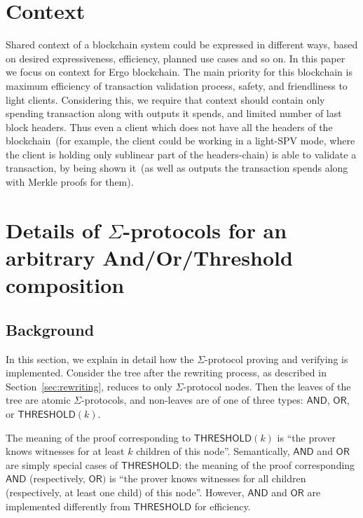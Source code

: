 \documentclass[11pt]{llncs}
\newcommand{\authnote}[2]{\marginpar{\parbox{\marginparwidth}{\tiny %
  \textsf{#1 {\textcolor{blue}{notes: #2}}}}}%
  \textcolor{blue}{\textbf{\dag}}}
\newcommand{\authnote}[2]{
  \textsf{#1 \textcolor{blue}{: #2}}}
\newcommand{\authnote}[2]{}
\newcommand{\lnote}[1]{{\authnote{\textcolor{orange}{Leo notes}}{#1}}}
\newcommand{\knote}[1]{{\authnote{\textcolor{green}{kushti notes}}{#1}}}
\begin{document}
\section{Context}

Shared context of a blockchain system could be expressed in different ways, based on desired expressiveness, efficiency, planned use cases and so on. In this paper we focus on context for Ergo blockchain. The main priority for this blockchain is maximum efficiency of transaction validation process, safety, and friendliness to light clients. Considering this, we require that context should contain only spending transaction along with outputs it spends, and limited number of last block headers. Thus even a client which does not have all the headers of the blockchain~(for example, the client could be working in a light-SPV mode, where the client is holding only sublinear part of the headers-chain) is able to validate a transaction, by being shown it~(as well as outputs the transaction spends along with Merkle proofs for them).

\knote{brief context description, link to an appendix with details}



\section{Details of $\Sigma$-protocols for an arbitrary And/Or/Threshold composition}
\newcommand{\andnode}{\ensuremath{\mathsf{AND}}}
\newcommand{\ornode}{\ensuremath{\mathsf{OR}}}
\newcommand{\tnode}{\ensuremath{\mathsf{THRESHOLD}}}
\newcommand{\GF}{\ensuremath{\mathrm{GF}}}
\subsection{Background}

\lnote{need to give some references that explain $\Sigma$-protocols well. Not sure what --- may need to dig through the literature}

In this section, we explain in detail how the $\Sigma$-protocol proving and verifying is implemented. Consider the tree after the rewriting process, as described in Section~\ref{sec:rewriting}, reduces to only $\Sigma$-protocol nodes. Then the leaves of the tree are atomic $\Sigma$-protocols, and non-leaves are of one of three types: $\andnode$, $\ornode$, or $\tnode(k)$. \lnote{connect these types to what's described above}

The meaning of the proof corresponding to $\tnode(k)$ is ``the prover knows witnesses for at least $k$ children of this node''. Semantically, $\andnode$ and $\ornode$ are simply special cases of $\tnode$: the meaning  of the proof corresponding $\andnode$ (respectively, $\ornode)$ is ``the prover knows witnesses for all children (respectively, at least one child) of this node''. However, $\andnode$ and $\ornode$ are implemented differently from $\tnode$ for efficiency.
\end{document}
